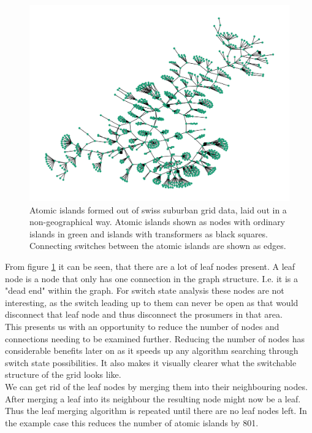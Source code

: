 \begin{figure}[H]
    \begin{center}
        \includegraphics[width=.7\linewidth]{img/switchstate_exploring/swiss_suburb/topology_with_leafs.png}
    \end{center}
    \caption{
        Atomic islands formed out of swiss suburban grid data, laid out in a non-geographical way.
        Atomic islands shown as nodes with 
        ordinary islands in green and islands with transformers as black squares. Connecting switches between the
        atomic islands are shown as edges.
    }
    \label{fig:data_prep:swiss_suburb_with_leafs}
\end{figure}

From figure \ref{fig:data_prep:swiss_suburb_with_leafs} it can be seen, that
there are a lot of leaf nodes present. A leaf node is a node that only has
one connection in the graph structure. I.e. it is a "dead end" within the graph.
For switch state analysis these nodes are not interesting, as the switch leading
up to them can never be open as that would disconnect that leaf node and thus
disconnect the prosumers in that area.\\
This presents us with an opportunity to
reduce the number of nodes and connections needing to be examined further. Reducing the number of
nodes has considerable benefits later on as it speeds up any algorithm
searching through switch state possibilities. It also makes it visually clearer
what the switchable structure of the grid looks like. \\
We can get rid of the leaf nodes by merging them into their neighbouring nodes. 
After merging a leaf into its neighbour the resulting node might now be a leaf. Thus 
the leaf merging algorithm is repeated until there are no leaf nodes left. In the example
case this reduces the number of atomic islands by 801.

